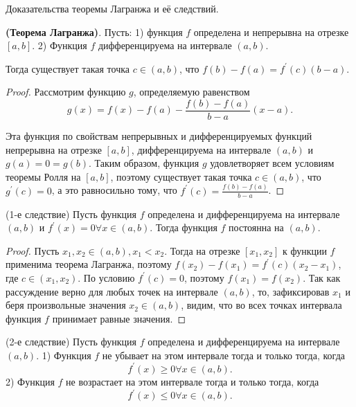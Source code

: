 \begin{problem}
Доказательства теоремы Лагранжа и её следствий.
\end{problem}
\begin{theorem} \textbf{(Теорема Лагранжа)}.
    Пусть:
    1) функция $f$ определена и непрерывна на отрезке $[a, b]$.
    2) Функция $f$ дифференцируема на интервале $(a, b)$.

    Тогда существует такая точка $c \in(a, b)$, что $f(b)-f(a)=f^{\prime}(c)(b-a)$.
\end{theorem}

\begin{proof}
    Рассмотрим функцию $g$, определяемую равенством
    $$
        g(x)=f(x)-f(a)-\frac{f(b)-f(a)}{b-a}(x-a) .
    $$

    Эта функция по свойствам непрерывных и дифференцируемых функций непрерывна на отрезке $[a, b]$, дифференцируема на интервале $(a, b)$ и $g(a)=0=g(b)$. Таким образом, функция $g$ удовлетворяет всем условиям теоремы Ролля на $[a, b]$, поэтому существует такая точка $c \in(a, b)$, что $g^{\prime}(c)=0$, а это равносильно тому, что $f^{\prime}(c)=\frac{f(b)-f(a)}{b-a}$.
\end{proof}


\begin{proposition}
    (1-е следствие) Пусть функция $f$ определена и дифференцируема на интервале $(a, b)$ и $f^{\prime}(x)=0 \forall x \in(a, b)$. Тогда функция $f$ постоянна на $(a, b)$.
\end{proposition}

\begin{proof}
    Пусть $x_1, x_2 \in(a, b), x_1<x_2$. Тогда на отрезке $\left[x_1, x_2\right]$ к функции $f$ применима теорема Лагранжа, поэтому $f\left(x_2\right)-f\left(x_1\right)=f^{\prime}(c)\left(x_2-x_1\right)$, где $c \in\left(x_1, x_2\right)$. По условию $f^{\prime}(c)=0$, поэтому $f\left(x_1\right)=f\left(x_2\right)$. Так как рассуждение верно для любых точек на интервале $(a, b)$, то, зафиксировав $x_1$ и беря произвольные значения $x_2 \in(a, b)$, видим, что во всех точках интервала функция $f$ принимает равные значения.
\end{proof}

\begin{proposition}
    (2-е следствие) Пусть функция $f$ определена и дифференцируема на интервале $(a, b)$.
    1) Функция $f$ не убывает на этом интервале тогда и только тогда, когда
    $$
        f^{\prime}(x) \geq 0 \forall x \in(a, b) .
    $$
    2) Функция $f$ не возрастает на этом интервале тогда и только тогда, когда
    $$
        f^{\prime}(x) \leq 0 \forall x \in(a, b) .
    $$
\end{proposition}

